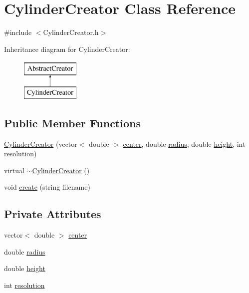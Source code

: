 \hypertarget{class_cylinder_creator}{}\section{Cylinder\+Creator Class Reference}
\label{class_cylinder_creator}


{\ttfamily \#include $<$Cylinder\+Creator.\+h$>$}

Inheritance diagram for Cylinder\+Creator\+:\begin{figure}[H]
\begin{center}
\leavevmode
\includegraphics[height=2.000000cm]{d0/d29/class_cylinder_creator}
\end{center}
\end{figure}
\subsection*{Public Member Functions}
\begin{DoxyCompactItemize}
\item 
\hyperlink{class_cylinder_creator_a3bd3c0c293bbc17c02cc5512c96695c5}{Cylinder\+Creator} (vector$<$ double $>$ \hyperlink{class_cylinder_creator_a78f2d1a2db1e3915e182fc102ad4ac96}{center}, double \hyperlink{class_cylinder_creator_a3558e3005e9567532b04a8f1d32ff4a4}{radius}, double \hyperlink{class_cylinder_creator_acd2b5826bf983377bb0f013c01e7329f}{height}, int \hyperlink{class_cylinder_creator_a9bb62db1072cadf1cce2962c7b954b9b}{resolution})
\item 
virtual \hyperlink{class_cylinder_creator_aa7b5874b41e919104682ca0e925f897a}{$\sim$\+Cylinder\+Creator} ()
\item 
void \hyperlink{class_cylinder_creator_ae4da1cf60c40253ab7f677d8d708eefe}{create} (string filename)
\end{DoxyCompactItemize}
\subsection*{Private Attributes}
\begin{DoxyCompactItemize}
\item 
vector$<$ double $>$ \hyperlink{class_cylinder_creator_a78f2d1a2db1e3915e182fc102ad4ac96}{center}
\item 
double \hyperlink{class_cylinder_creator_a3558e3005e9567532b04a8f1d32ff4a4}{radius}
\item 
double \hyperlink{class_cylinder_creator_acd2b5826bf983377bb0f013c01e7329f}{height}
\item 
int \hyperlink{class_cylinder_creator_a9bb62db1072cadf1cce2962c7b954b9b}{resolution}
\end{DoxyCompactItemize}


